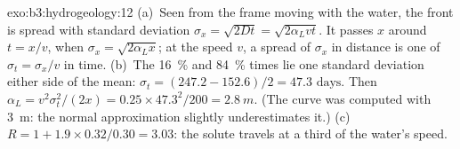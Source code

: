 \begin{solution}{exo:b3:hydrogeology:12}
(a)~Seen from the frame moving with the water, the front is spread with
standard deviation $\sigma_x = \sqrt{2Dt} = \sqrt{2\alpha_Lvt}$. It passes
$x$ around $t = x/v$, when $\sigma_x = \sqrt{2\alpha_Lx}$; at the speed
$v$, a spread of $\sigma_x$ in distance is one of $\sigma_t = \sigma_x/v$
in time. (b)~The \qty{16}{\percent} and \qty{84}{\percent} times lie one
standard deviation either side of the mean: $\sigma_t = (247.2 -
152.6)/2 = \num{47.3}\text{ days}$. Then $\alpha_L = v^2\sigma_t^2/(2x) =
0.25\times47.3^2/200 = \qty{2.8}{m}$. (The curve was computed with
\qty{3}{m}: the normal approximation slightly underestimates it.) (c)~$R =
1 + 1.9\times0.32/0.30 = \num{3.03}$: the solute travels at a third of the
water's speed.
\end{solution}

